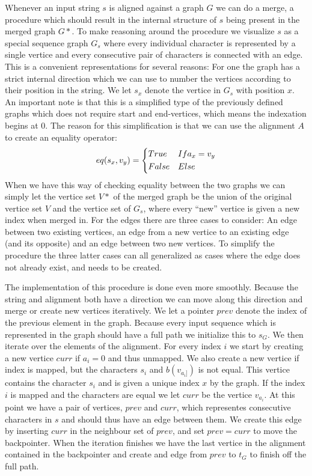 \documentclass[thesis.tex]{subfiles}
\begin{document}
\par\noindent
Whenever an input string $s$ is aligned against a graph $G$ we can do a merge, a procedure which should result in the internal structure of $s$ being present in the merged graph $G*$. To make reasoning around the procedure we visualize $s$ as a special sequence graph $G_s$ where every individual character is represented by a single vertice and every consecutive pair of characters is connected with an edge. This is a convenient representations for several reasons: For one the graph has a strict internal direction which we can use to number the vertices according to their position in the string. We let $s_x$ denote the vertice in $G_s$ with position $x$. An important note is that this is a simplified type of the previously defined graphs which does not require start and end-vertices, which means the indexation begins at 0. The reason for this simplification is that we can use the alignment $A$ to create an equality operator:
\begin{equation}
  eq(s_x, v_y) =
  \begin{dcases}
    True & If a_x=v_y\\
    False & Else
  \end{dcases}
\end{equation}
When we have this way of checking equality between the two graphs we can simply let the vertice set $V*$ of the merged graph be the union of the original vertice set $V$ and the vertice set of $G_s$, where every ``new'' vertice is given a new index when merged in. For the edges there are three cases to consider: An edge between two existing vertices, an edge from a new vertice to an existing edge (and its opposite) and an edge between two new vertices. To simplify the procedure the three latter cases can all generalized as cases where the edge does not already exist, and needs to be created.\\
\par\noindent
The implementation of this procedure is done even more smoothly. Because the string and alignment both have a direction we can move along this direction and merge or create new vertices iteratively. We let a pointer $prev$ denote the index of the previous element in the graph. Because every input sequence which is represented in the graph should have a full path we initialize this to $s_G$. We then iterate over the elements of the alignment. For every index $i$ we start by creating a new vertice $curr$ if $a_i = 0$ and thus unmapped. We also create a new vertice if index is mapped, but the characters $s_i$ and $b(v_{a_i]})$ is not equal. This vertice contains the character $s_i$ and is given a unique index $x$ by the graph. If the index $i$ is mapped and the characters are equal we let $curr$ be the vertice $v_{a_i}$. At this point we have a pair of vertices, $prev$ and $curr$, which representes consecutive characters in $s$ and should thus have an edge between them. We create this edge by inserting $curr$ in the neighbour set of $prev$, and set $prev=curr$ to move the backpointer. When the iteration finishes we have the last vertice in the alignment contained in the backpointer and create and edge from $prev$ to $t_G$ to finish off the full path.\\
\end{document}
